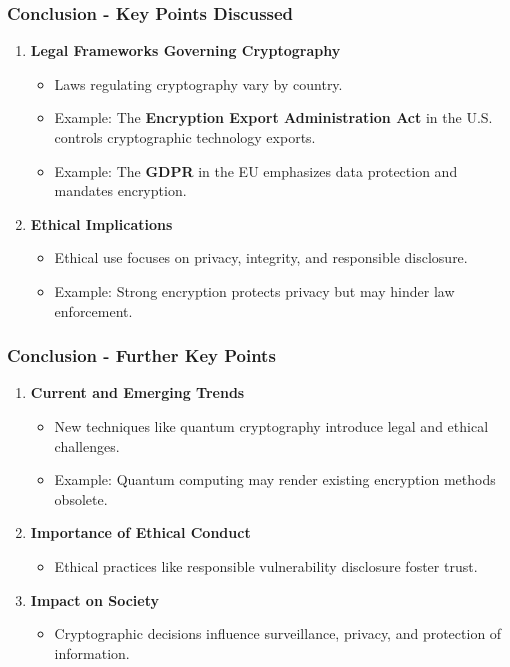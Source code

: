 \documentclass{beamer}
\begin{document}
\begin{frame}[fragile]
    \frametitle{Conclusion - Key Points Discussed}
    \begin{enumerate}
        \item \textbf{Legal Frameworks Governing Cryptography}
            \begin{itemize}
                \item Laws regulating cryptography vary by country.
                \item Example: The \textbf{Encryption Export Administration Act} in the U.S. controls cryptographic technology exports.
                \item Example: The \textbf{GDPR} in the EU emphasizes data protection and mandates encryption.
            \end{itemize}
        
        \item \textbf{Ethical Implications}
            \begin{itemize}
                \item Ethical use focuses on privacy, integrity, and responsible disclosure.
                \item Example: Strong encryption protects privacy but may hinder law enforcement.
            \end{itemize}
    \end{enumerate}
\end{frame}

\begin{frame}[fragile]
    \frametitle{Conclusion - Further Key Points}
    \begin{enumerate}[resume]
        \item \textbf{Current and Emerging Trends}
            \begin{itemize}
                \item New techniques like quantum cryptography introduce legal and ethical challenges.
                \item Example: Quantum computing may render existing encryption methods obsolete.
            \end{itemize}
        
        \item \textbf{Importance of Ethical Conduct}
            \begin{itemize}
                \item Ethical practices like responsible vulnerability disclosure foster trust.
            \end{itemize}
        
        \item \textbf{Impact on Society}
            \begin{itemize}
                \item Cryptographic decisions influence surveillance, privacy, and protection of information.
            \end{itemize}
    \end{enumerate}
\end{frame}
\end{document}
